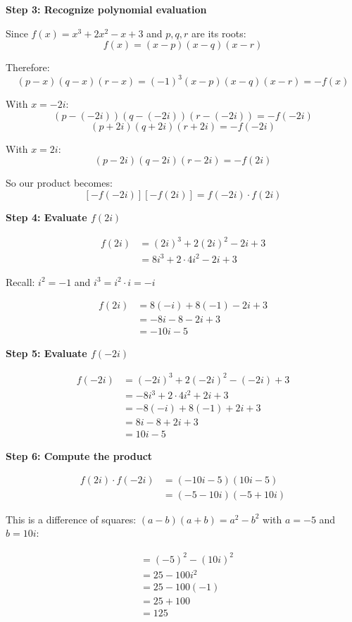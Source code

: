 \documentclass[12pt]{article}
\begin{document}
\textbf{Step 3: Recognize polynomial evaluation}

Since $f(x) = x^3 + 2x^2 - x + 3$ and $p, q, r$ are its roots:
\[f(x) = (x - p)(x - q)(x - r)\]

Therefore:
\[(p - x)(q - x)(r - x) = (-1)^3(x - p)(x - q)(x - r) = -f(x)\]

With $x = -2i$:
\[(p - (-2i))(q - (-2i))(r - (-2i)) = -f(-2i)\]
\[(p + 2i)(q + 2i)(r + 2i) = -f(-2i)\]

With $x = 2i$:
\[(p - 2i)(q - 2i)(r - 2i) = -f(2i)\]

So our product becomes:
\[[-f(-2i)][-f(2i)] = f(-2i) \cdot f(2i)\]

\textbf{Step 4: Evaluate $f(2i)$}

\begin{align*}
f(2i) &= (2i)^3 + 2(2i)^2 - 2i + 3\\
&= 8i^3 + 2 \cdot 4i^2 - 2i + 3
\end{align*}

Recall: $i^2 = -1$ and $i^3 = i^2 \cdot i = -i$

\begin{align*}
f(2i) &= 8(-i) + 8(-1) - 2i + 3\\
&= -8i - 8 - 2i + 3\\
&= -10i - 5
\end{align*}

\textbf{Step 5: Evaluate $f(-2i)$}

\begin{align*}
f(-2i) &= (-2i)^3 + 2(-2i)^2 - (-2i) + 3\\
&= -8i^3 + 2 \cdot 4i^2 + 2i + 3\\
&= -8(-i) + 8(-1) + 2i + 3\\
&= 8i - 8 + 2i + 3\\
&= 10i - 5
\end{align*}

\textbf{Step 6: Compute the product}

\begin{align*}
f(2i) \cdot f(-2i) &= (-10i - 5)(10i - 5)\\
&= (-5 - 10i)(-5 + 10i)
\end{align*}

This is a difference of squares: $(a - b)(a + b) = a^2 - b^2$ with $a = -5$ and $b = 10i$:

\begin{align*}
&= (-5)^2 - (10i)^2\\
&= 25 - 100i^2\\
&= 25 - 100(-1)\\
&= 25 + 100\\
&= 125
\end{align*}
\end{document}
